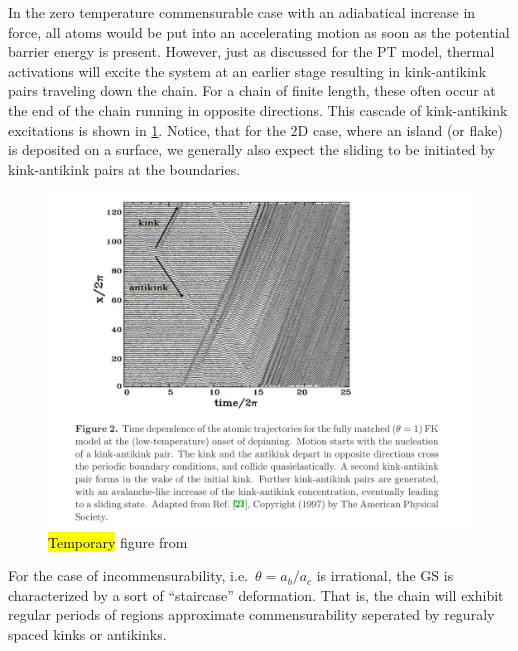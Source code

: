 In the zero temperature commensurable case with an adiabatical increase in force, all atoms would be put into an accelerating motion as soon as the potential barrier energy is present. However, just as discussed for the \acrshort{PT} model, thermal activations will excite the system at an earlier stage resulting in kink-antikink pairs traveling down the chain. For a chain of finite length, these often occur at the end of the chain running in opposite directions. This cascade of kink-antikink excitations is shown in \cref{fig:kink_antikink}. Notice, that for the 2D case, where an island (or flake) is deposited on a surface, we generally also expect the sliding to be initiated by kink-antikink pairs at the boundaries. 

\begin{figure}[H]
  \centering
  \includegraphics[width=0.8\linewidth]{figures/theory/kink_antikink.png}
  \caption{\hl{Temporary} figure from \cite{Manini_2016}}
  \label{fig:kink_antikink}
\end{figure}


For the case of incommensurability, i.e.\ $\theta = a_b/a_c$ is irrational, the
\acrshort{GS} is characterized by a sort of ``staircase''  deformation. That is, the chain will exhibit regular periods of regions approximate commensurability seperated by reguraly spaced kinks or antikinks.



